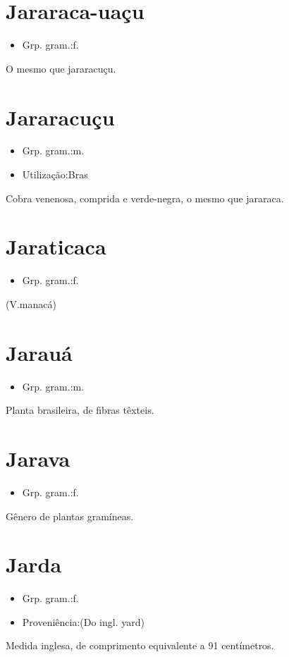 \documentclass{article}
\begin{document}
\section{Jararaca-uaçu}
\begin{itemize}
\item {Grp. gram.:f.}
\end{itemize}
O mesmo que \textunderscore jararacuçu\textunderscore .
\section{Jararacuçu}
\begin{itemize}
\item {Grp. gram.:m.}
\end{itemize}
\begin{itemize}
\item {Utilização:Bras}
\end{itemize}
Cobra venenosa, comprida e verde-negra, o mesmo que \textunderscore jararaca\textunderscore .
\section{Jaraticaca}
\begin{itemize}
\item {Grp. gram.:f.}
\end{itemize}
(V.manacá)
\section{Jarauá}
\begin{itemize}
\item {Grp. gram.:m.}
\end{itemize}
Planta brasileira, de fibras têxteis.
\section{Jarava}
\begin{itemize}
\item {Grp. gram.:f.}
\end{itemize}
Gênero de plantas gramíneas.
\section{Jarda}
\begin{itemize}
\item {Grp. gram.:f.}
\end{itemize}
\begin{itemize}
\item {Proveniência:(Do ingl. \textunderscore yard\textunderscore )}
\end{itemize}
Medida inglesa, de comprimento equivalente a 91 centímetros.
\end{document}
